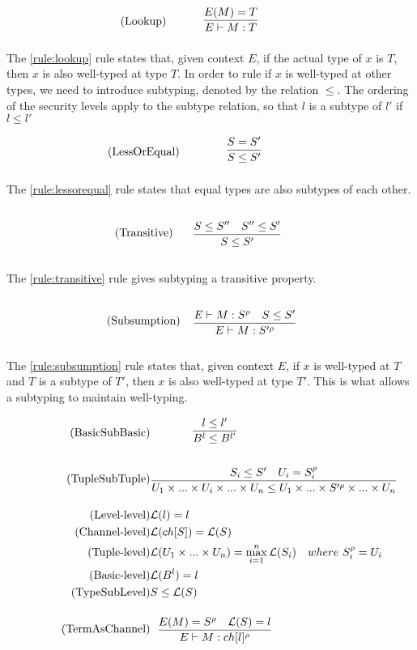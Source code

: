 \begin{align*}
\tag{Lookup}\label{rule:lookup} &\infrule{E(M)=T}{E\vdash M:T}
\end{align*}

The \ref{rule:lookup} rule states that, given context $E$, if the actual type of $x$ is $T$, then $x$ is also well-typed at type $T$. 
In order to rule if $x$ is well-typed at other types, we need to introduce subtyping, denoted by the relation $\leq$. The ordering of the security levels apply to the subtype relation, so that $l$ is a subtype of $l'$ if $l\leq l'$

\begin{align*}
\tag{LessOrEqual}\label{rule:lessorequal} &\infrule{S=S'}{S\leq S'}
\end{align*}

The \ref{rule:lessorequal} rule states that equal types are also subtypes of each other.

\begin{align*}
\tag{Transitive}\label{rule:transitive} &\infrule{S\leq S''\quad S''\leq S'}{S\leq S'}
\end{align*}

The \ref{rule:transitive} rule gives subtyping a transitive property.

\begin{align*}
\tag{Subsumption}\label{rule:subsumption} &\infrule{E\vdash M:S^\rho\quad S\leq S'}{E\vdash M:S'^\rho}
\end{align*}

The \ref{rule:subsumption} rule states that, given context $E$, if $x$ is well-typed at $T$ and $T$ is a subtype of $T'$, then $x$ is also well-typed at type $T'$. This is what allows a subtyping to maintain well-typing.

\begin{align*}
\tag{BasicSubBasic} &\infrule{l\leq l'}{B^l\leq B^{l'}}\\
\tag{TupleSubTuple} &\infrule{S_i\leq S'\quad U_i=S_i^\rho}{U_1\times...\times U_i\times...\times U_n\leq U_1\times...\times S'^\rho\times...\times U_n}\\
\tag{Level-level} &\level{l}=l\\
\tag{Channel-level} &\level{ch[S]} = \level{S}\\
\tag{Tuple-level} &\level{U_1\times...\times U_n}=\max_{i=1}^{n}{\level{S_i}}& where\ S_i^\rho=U_i\\
\tag{Basic-level} &\level{B^l}=l\\
\tag{TypeSubLevel} &S\leq \level{S}\\
\tag{TermAsChannel} &\infrule{E(M)=S^\rho\quad \level{S}=l}{E\vdash M:ch[l]^\rho}
\end{align*}

